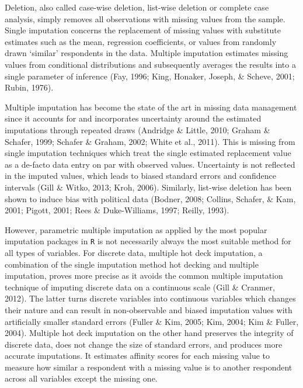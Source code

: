 \documentclass[12pt,econ]{sources/authesis}
\begin{document}
Deletion, also called case-wise deletion, list-wise deletion or complete case analysis, simply removes all observations with missing values from the sample. Single imputation concerns the replacement of missing values with substitute estimates such as the mean, regression coefficients, or values from randomly drawn `similar' respondents in the data. Multiple imputation estimates missing values from conditional distributions and subsequently averages the results into a single parameter of inference (Fay, 1996; King, Honaker, Joseph, \& Scheve, 2001; Rubin, 1976).

Multiple imputation has become the state of the art in missing data management since it accounts for and incorporates uncertainty around the estimated imputations through repeated draws (Andridge \& Little, 2010; Graham \& Schafer, 1999; Schafer \& Graham, 2002; White et al., 2011). This is missing from single imputation techniques which treat the single estimated replacement value as a de-facto data entry on par with observed values. Uncertainty is not reflected in the imputed values, which leads to biased standard errors and confidence intervals (Gill \& Witko, 2013; Kroh, 2006). Similarly, list-wise deletion has been shown to induce bias with political data (Bodner, 2008; Collins, Schafer, \& Kam, 2001; Pigott, 2001; Rees \& Duke-Williams, 1997; Reilly, 1993).

However, parametric multiple imputation as applied by the most popular imputation packages in \texttt{R} is not necessarily always the most suitable method for all types of variables. For discrete data, multiple hot deck imputation, a combination of the single imputation method hot decking and multiple imputation, proves more precise as it avoids the common multiple imputation technique of imputing discrete data on a continuous scale (Gill \& Cranmer, 2012). The latter turns discrete variables into continuous variables which changes their nature and can result in non-observable and biased imputation values with artificially smaller standard errors (Fuller \& Kim, 2005; Kim, 2004; Kim \& Fuller, 2004). Multiple hot deck imputation on the other hand preserves the integrity of discrete data, does not change the size of standard errors, and produces more accurate imputations. It estimates affinity scores for each missing value to measure how similar a respondent with a missing value is to another respondent across all variables except the missing one.
\end{document}

